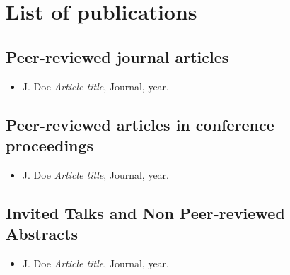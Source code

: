 \chapter*{List of publications}
\newcommand{\ipj}{(\textit{in preparation for journal submission})}
\newcommand{\cur}{(\textit{under review})}
\newcommand{\sbm}{(\textit{submitted})}
\newcommand{\acp}{(\textit{accepted})}
\newcommand{\inp}{(\textit{in press})}


\section*{Peer-reviewed journal articles}
\begin{itemize}[leftmargin=4mm]
	\item J. Doe \textit{Article title}, Journal, year. 
\end{itemize}

\section*{Peer-reviewed articles in conference proceedings}
\begin{itemize}[leftmargin=4mm]
	\item J. Doe \textit{Article title}, Journal, year. 
\end{itemize}

\section*{Invited Talks and Non Peer-reviewed Abstracts}
\begin{itemize}[leftmargin=4mm]
	\item J. Doe \textit{Article title}, Journal, year. 
\end{itemize}

